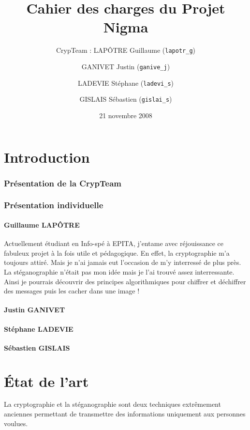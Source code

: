 \documentclass[a4paper,12pt]{article}
\title{Cahier des charges du Projet Nigma}
\author{CrypTeam : LAPÔTRE Guillaume (\texttt{lapotr\_g}) \and GANIVET Justin (\texttt{ganive\_j}) \and LADEVIE Stéphane (\texttt{ladevi\_s}) \and GISLAIS Sébastien (\texttt{gislai\_s})}
\date{21 novembre 2008}
\begin{document}
\maketitle{}
\newpage
\tableofcontents
\newpage
\part{Introduction}

\section {Présentation de la CrypTeam}

\section {Présentation individuelle}

\subsection{Guillaume LAPÔTRE}

Actuellement étudiant en Info-spé à EPITA, j'entame avec réjouissance ce fabuleux projet à la fois utile et pédagogique. En effet, la cryptographie m'a toujours attiré. Mais je n'ai jamais eut l'occasion de m'y interressé de plus près. La stéganographie n'était pas mon idée mais je l'ai trouvé assez interressante. Ainsi je pourrais découvrir des principes algorithmiques pour chiffrer et déchiffrer des messages puis les cacher dans une image !

\subsection{Justin GANIVET}

\subsection{Stéphane LADEVIE}

\subsection{Sébastien GISLAIS}

\newpage

\part{\'{E}tat de l'art}
La cryptographie et la stéganographie sont deux techniques extrêmement anciennes permettant de transmettre des informations uniquement aux personnes voulues.
\end{document}

